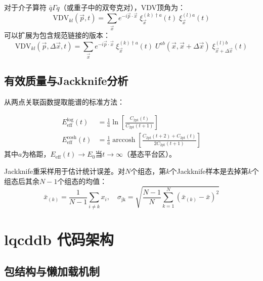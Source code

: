 \documentclass[11pt,a4paper]{ctexart}
\begin{document}
\begin{physicsbox}
对于介子算符 $\bar{q} \Gamma q$（或重子中的双夸克对），VDV顶角为：
\begin{equation}
\mathrm{VDV}_{kl}(\vec{p}, t) = \sum_{\vec{x}} e^{-i\vec{p}\cdot\vec{x}} \;
\xi^{(k)\dagger a}_{\vec{x}}(t) \; \xi^{(l)a}_{\vec{x}}(t)
\end{equation}
可以扩展为包含规范链接的版本：
\begin{equation}
\mathrm{VDV}_{kl}(\vec{p}, \Delta\vec{x}, t) = \sum_{\vec{x}} e^{-i\vec{p}\cdot\vec{x}} \;
\xi^{(k)\dagger a}_{\vec{x}}(t) \; U^{ab}(\vec{x}, \vec{x}+\Delta\vec{x}) \; \xi^{(l)b}_{\vec{x}+\Delta\vec{x}}(t)
\end{equation}
\end{physicsbox}

\subsection{有效质量与Jackknife分析}

从两点关联函数提取能谱的标准方法：

\begin{physicsbox}[有效质量]
\begin{align}
E_{\mathrm{eff}}^{\mathrm{log}}(t) &= \frac{1}{a} \ln\left[ \frac{C_{2\mathrm{pt}}(t)}{C_{2\mathrm{pt}}(t+1)} \right] \\
E_{\mathrm{eff}}^{\mathrm{cosh}}(t) &= \frac{1}{a} \operatorname{arccosh}\left[ \frac{C_{2\mathrm{pt}}(t+2) + C_{2\mathrm{pt}}(t)}{2 C_{2\mathrm{pt}}(t+1)} \right]
\end{align}
其中$a$为格距，$E_{\mathrm{eff}}(t) \to E_0$当$t \to \infty$（基态平台区）。
\end{physicsbox}

Jackknife重采样用于估计统计误差。对$N$个组态，第$k$个Jackknife样本是去掉第$k$个组态后其余$N-1$个组态的均值：
\begin{equation}
\bar{x}_{(k)} = \frac{1}{N-1} \sum_{i \neq k} x_i, \quad
\sigma_{\mathrm{jk}} = \sqrt{\frac{N-1}{N} \sum_{k=1}^{N} (\bar{x}_{(k)} - \bar{x})^2}
\end{equation}

\section{lqcddb 代码架构}

\subsection{包结构与懒加载机制}
\end{document}
